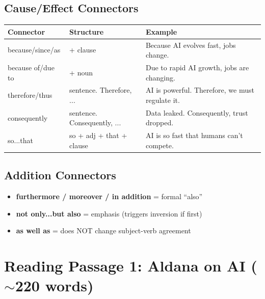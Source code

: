 \documentclass[10pt,a4paper]{article}
\begin{document}
\subsection*{Cause/Effect Connectors}

\begin{center}
\begin{tabular}{lll}
\toprule
\textbf{Connector} & \textbf{Structure} & \textbf{Example} \\
\midrule
because/since/as & + clause & Because AI evolves fast, jobs change. \\
because of/due to & + noun & Due to rapid AI growth, jobs are changing. \\
therefore/thus & sentence. Therefore, ... & AI is powerful. Therefore, we must regulate it. \\
consequently & sentence. Consequently, ... & Data leaked. Consequently, trust dropped. \\
so...that & so + adj + that + clause & AI is so fast that humans can't compete. \\
\bottomrule
\end{tabular}
\end{center}

\subsection*{Addition Connectors}

\begin{itemize}[nosep]
\item \textbf{furthermore / moreover / in addition} = formal ``also''
\item \textbf{not only...but also} = emphasis (triggers inversion if first)
\item \textbf{as well as} = does NOT change subject-verb agreement
\end{itemize}

\section*{Reading Passage 1: Aldana on AI ($\sim$220 words)}
\end{document}
